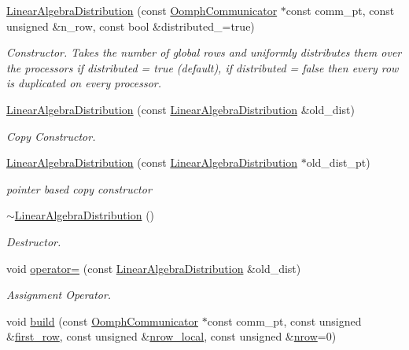 \begin{DoxyCompactItemize}
\hyperlink{classoomph_1_1LinearAlgebraDistribution_a5bb5b3cfbe3b635779066e5a3e00be6e}{Linear\+Algebra\+Distribution} (const \hyperlink{classoomph_1_1OomphCommunicator}{Oomph\+Communicator} $\ast$const comm\+\_\+pt, const unsigned \&n\+\_\+row, const bool \&distributed\+\_\+=true)
\begin{DoxyCompactList}\small\item\em Constructor. Takes the number of global rows and uniformly distributes them over the processors if distributed = true (default), if distributed = false then every row is duplicated on every processor. \end{DoxyCompactList}\item 
\hyperlink{classoomph_1_1LinearAlgebraDistribution_ad1857bf3eaab8d87991b651f7a52d4ff}{Linear\+Algebra\+Distribution} (const \hyperlink{classoomph_1_1LinearAlgebraDistribution}{Linear\+Algebra\+Distribution} \&old\+\_\+dist)
\begin{DoxyCompactList}\small\item\em Copy Constructor. \end{DoxyCompactList}\item 
\hyperlink{classoomph_1_1LinearAlgebraDistribution_ad7984b69feba8f8797f60639dc962fe4}{Linear\+Algebra\+Distribution} (const \hyperlink{classoomph_1_1LinearAlgebraDistribution}{Linear\+Algebra\+Distribution} $\ast$old\+\_\+dist\+\_\+pt)
\begin{DoxyCompactList}\small\item\em pointer based copy constructor \end{DoxyCompactList}\item 
\hyperlink{classoomph_1_1LinearAlgebraDistribution_a3d4a398895bcdd1a66493ac555cd6dee}{$\sim$\+Linear\+Algebra\+Distribution} ()
\begin{DoxyCompactList}\small\item\em Destructor. \end{DoxyCompactList}\item 
void \hyperlink{classoomph_1_1LinearAlgebraDistribution_a0339adfd0ac99e1a443b7313063beaa9}{operator=} (const \hyperlink{classoomph_1_1LinearAlgebraDistribution}{Linear\+Algebra\+Distribution} \&old\+\_\+dist)
\begin{DoxyCompactList}\small\item\em Assignment Operator. \end{DoxyCompactList}\item 
void \hyperlink{classoomph_1_1LinearAlgebraDistribution_a3cab441019e738e4c6db6ee22dd71515}{build} (const \hyperlink{classoomph_1_1OomphCommunicator}{Oomph\+Communicator} $\ast$const comm\+\_\+pt, const unsigned \&\hyperlink{classoomph_1_1LinearAlgebraDistribution_a2634e540a78fe1ee3f5c907aff500b58}{first\+\_\+row}, const unsigned \&\hyperlink{classoomph_1_1LinearAlgebraDistribution_ac9310de740f9c3a61f8d5dab9bef88ca}{nrow\+\_\+local}, const unsigned \&\hyperlink{classoomph_1_1LinearAlgebraDistribution_aafad0b69de2284808366b65bd63e493b}{nrow}=0)

\end{DoxyCompactItemize}
